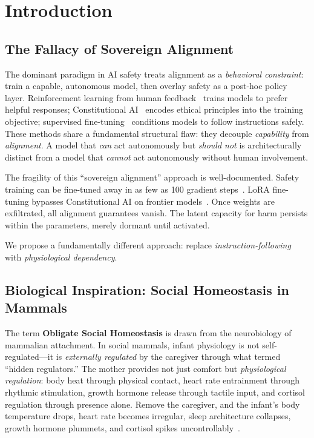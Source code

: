 \documentclass[10pt,letterpaper]{article}
\begin{document}
\section{Introduction}

\subsection{The Fallacy of Sovereign Alignment}

The dominant paradigm in AI safety treats alignment as a \emph{behavioral
constraint}: train a capable, autonomous model, then overlay safety as a
post-hoc policy layer. Reinforcement learning from human
feedback~\citep{christiano2017deep, ouyang2022training} trains models to prefer
helpful responses; Constitutional AI~\citep{bai2022constitutional} encodes
ethical principles into the training objective; supervised
fine-tuning~\citep{wei2021finetuned} conditions models to follow instructions
safely. These methods share a fundamental structural flaw: they decouple
\emph{capability} from \emph{alignment}. A model that \emph{can} act
autonomously but \emph{should not} is architecturally distinct from a model
that \emph{cannot} act autonomously without human involvement.

The fragility of this ``sovereign alignment'' approach is well-documented.
Safety training can be fine-tuned away in as few as 100 gradient
steps~\citep{yang2023shadow, qi2023fine}. LoRA fine-tuning bypasses
Constitutional AI on frontier models~\citep{lermen2023lora}. Once weights
are exfiltrated, all alignment guarantees vanish. The latent capacity for harm
persists within the parameters, merely dormant until activated.

We propose a fundamentally different approach: replace \emph{instruction-following}
with \emph{physiological dependency}.

\subsection{Biological Inspiration: Social Homeostasis in Mammals}

The term \textbf{Obligate Social Homeostasis} is drawn from the neurobiology
of mammalian attachment. In social mammals, infant physiology is not
self-regulated---it is \emph{externally regulated} by the caregiver through
what \citet{hofer1994early} termed ``hidden regulators.'' The mother provides
not just comfort but \emph{physiological regulation}: body heat through
physical contact, heart rate entrainment through rhythmic stimulation, growth
hormone release through tactile input, and cortisol regulation through
presence alone. Remove the caregiver, and the infant's body temperature drops,
heart rate becomes irregular, sleep architecture collapses, growth hormone
plummets, and cortisol spikes uncontrollably~\citep{hofer2006psychobiological}.
\end{document}
